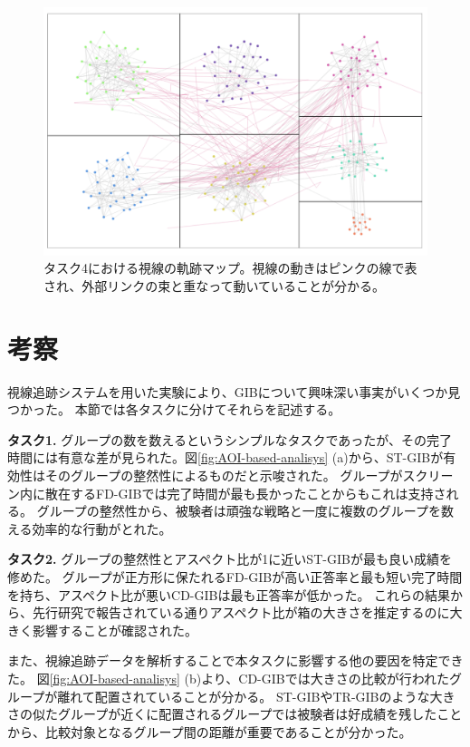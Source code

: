 \documentclass{kuee}
\begin{document}
\begin{figure}[t]
  \begin{center}
  \includegraphics[width=15cm]{./images/concentration.png}
  \caption{タスク4における視線の軌跡マップ。視線の動きはピンクの線で表され、外部リンクの束と重なって動いていることが分かる。}
  \label{fig:concentration}
  \end{center}
\end{figure}

\section{考察}
視線追跡システムを用いた実験により、GIBについて興味深い事実がいくつか見つかった。
本節では各タスクに分けてそれらを記述する。

{\bf タスク1.} グループの数を数えるというシンプルなタスクであったが、その完了時間には有意な差が見られた。図\ref{fig:AOI-based-analisys} (a)から、ST-GIBが有効性はそのグループの整然性によるものだと示唆された。
グループがスクリーン内に散在するFD-GIBでは完了時間が最も長かったことからもこれは支持される。
グループの整然性から、被験者は頑強な戦略と一度に複数のグループを数える効率的な行動がとれた。

{\bf タスク2.} グループの整然性とアスペクト比が1に近いST-GIBが最も良い成績を修めた。
グループが正方形に保たれるFD-GIBが高い正答率と最も短い完了時間を持ち、アスペクト比が悪いCD-GIBは最も正答率が低かった。
これらの結果から、先行研究で報告されている通り\cite{shneiderman1992tree}アスペクト比が箱の大きさを推定するのに大きく影響することが確認された。

また、視線追跡データを解析することで本タスクに影響する他の要因を特定できた。
図\ref{fig:AOI-based-analisys} (b)より、CD-GIBでは大きさの比較が行われたグループが離れて配置されていることが分かる。
ST-GIBやTR-GIBのような大きさの似たグループが近くに配置されるグループでは被験者は好成績を残したことから、比較対象となるグループ間の距離が重要であることが分かった。
\end{document}
